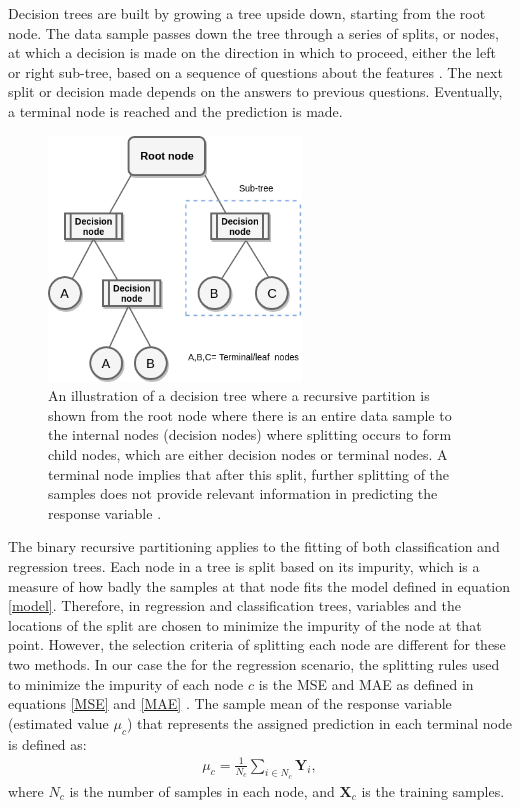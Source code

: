 Decision trees are built by growing a tree upside down, starting from the root node. The data sample passes down the tree through a series of splits, or nodes, at which a decision is made on the direction in which to proceed, either the left or right sub-tree, based on a sequence of questions about the features \citep{musicant2007supervised}. The next split or decision made depends on the answers to previous questions. Eventually, a terminal node is reached and the prediction is made.  

 \begin{figure}[H]
  \centering
    \includegraphics[width=0.6\textwidth]{images/DC.png}
    \caption{An illustration of a decision tree where a recursive partition is shown from the root node where there is an entire data sample to the internal nodes (decision nodes) where splitting occurs to form child nodes, which are either decision nodes or terminal nodes. A terminal node implies that after this split, further splitting of the samples does not provide relevant information in predicting the response variable \citep{moisen2008classification}. }
  \label{images/DecisionTree}
\end{figure}

The binary recursive partitioning applies to the fitting of both classification and regression trees. Each node in a tree is split based on its impurity, which is a measure of how badly the samples at that node fits the model defined in equation \ref{model}. Therefore, in regression and classification trees, variables and the locations of the split are
chosen to minimize the impurity of the node at that point. However, the selection criteria of splitting each node are different for these two methods. In our case the for the regression scenario, the splitting rules used to minimize the impurity of each node $c$ is the MSE and MAE as defined in equations \ref{MSE} and \ref{MAE} \citep{morgan2014classification}. The sample mean of the response variable (estimated value $\mu_{c}$) that represents the assigned prediction in each terminal node is defined as: 
\begin{align}
\mu_{c}=\frac{1}{N_{c}} \sum_{i\in N_{c}} \textbf{Y}_{i},
\label{model}
\end{align} 
where $N_{c}$ is the number of samples in each node, and $\textbf{X}_{c}$ is the training samples. 
 

